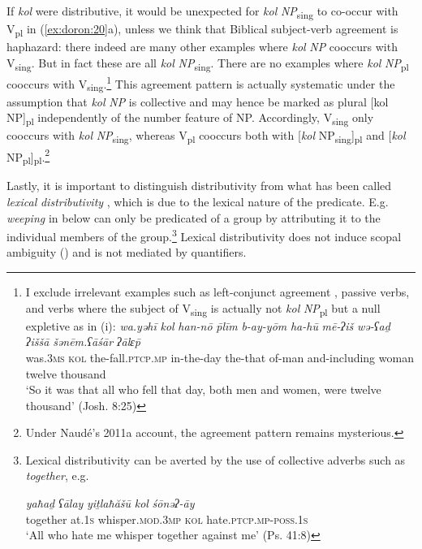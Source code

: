 \documentclass[output=paper]{langsci/langscibook}
\begin{document}
If \textit{kol} were distributive, it would be unexpected for \textit{kol} \textit{NP}\textsubscript{sing} to co-occur with V\textsubscript{pl} in (\ref{ex:doron:20}a), unless we think that Biblical subject-verb agreement is haphazard: there indeed are many  other examples where \textit{kol} \textit{NP} cooccurs with V\textsubscript{sing}. But in fact these are all \textit{kol} \textit{NP}\textsubscript{sing}. There are no examples where \textit{kol} \textit{NP}\textsubscript{pl} cooccurs with V\textsubscript{sing}.\footnote{I exclude irrelevant examples such as left-conjunct agreement \citep{Doron2005}, passive verbs, and verbs where the subject of \textrm{V}\textrm{\textsubscript{sing}} is actually not \textit{kol} \textit{NP}\textsubscript{pl} but a null expletive as in (i): 
\ea \gll \textit{wa.yəhī}   \textit{kol}   {\textit{han-nō} \textit{\={p}līm}}  \textit{b-ay-yōm}  \textit{ha-hū}    \textit{mē-ʔiš}  \textit{wə-ʕaḏ} \textit{ʔiššā}  \textit{šənēm.ʕāśār} \textit{ʔālɛ\={p}}\\
was.\textsc{3ms} \textsc{kol} the-fall.\textsc{ptcp.mp} in-the-day the-that of-man and-including woman twelve thousand\\
\glt `So it was that all who fell that day, both men and women, were twelve thousand' (Josh. 8:25)\z} This agreement pattern is actually systematic under the assumption that \textit{kol} \textit{NP} is collective and may hence be marked as plural [kol NP]\textsubscript{pl} independently of the number feature of NP. Accordingly, V\textsubscript{sing} only cooccurs with \textit{kol} \textit{NP}\textsubscript{sing}, whereas V\textsubscript{pl} cooccurs both with [\textit{kol} NP\textsubscript{sing}]\textsubscript{pl} and [\textit{kol} NP\textsubscript{pl}]\textsubscript{pl}.\footnote{Under Naudé’s 2011a account, the agreement pattern remains mysterious.}

Lastly, it is important to distinguish distributivity from what has been called \textit{lexical} \textit{distributivity} \citep{Winter2000}, which is due to the lexical nature of the predicate. E.g. \textit{weeping} in  below can only be predicated of a group by attributing it to the individual members of the group.\footnote{Lexical distributivity can be averted by the use of collective adverbs such as \textit{together}, e.g.

\ea \gll  \textit{yaħaḏ}     \textit{ʕālay} \textit{yiṯlaħăšū}                 \textit{kol}   \textit{śōnəʔ-āy}\\
         together at.\textsc{1s}  whisper.\textsc{mod.3mp}  \textsc{kol}  hate.\textsc{ptcp.mp}-\textsc{poss.1s}\\ 
\glt `All who hate me whisper together against me' (Ps. 41:8)\z} Lexical distributivity does not induce scopal ambiguity (\citealt{Vries2017}) and is not mediated by quantifiers.
\end{document}
